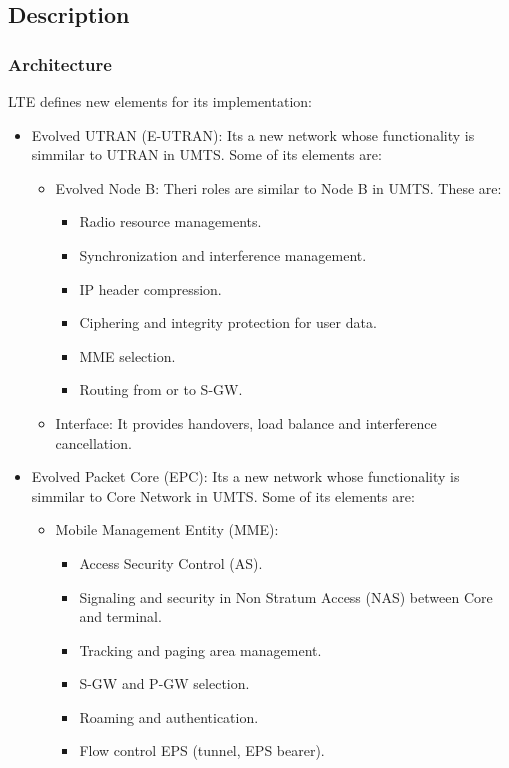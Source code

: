 \documentclass[
	12pt,
	twoside
]{book}
\begin{document}
\subsection{Description}

\subsubsection{Architecture}

LTE defines new elements for its implementation:
\begin{itemize}
	\item {
		Evolved UTRAN (E-UTRAN): Its a new network whose functionality is simmilar to UTRAN in UMTS. Some of its elements are:
		\begin{itemize}
			\item {
				Evolved Node B: Theri roles are similar to Node B in UMTS. These are:
				\begin{itemize}
					\item Radio resource managements.
					\item Synchronization and interference management.
					\item IP header compression.
					\item Ciphering and integrity protection for user data.
					\item MME selection.
					\item Routing from or to S-GW.
				\end{itemize}
			}
			\item Interface: It provides handovers, load balance and interference cancellation.
		\end{itemize}
	}
	\item {
		Evolved Packet Core (EPC): Its a new network whose functionality is simmilar to Core Network in UMTS. Some of its elements are:
		\begin{itemize}
			\item {
				Mobile Management Entity (MME):
				\begin{itemize}
					\item Access Security Control (AS).
					\item Signaling and security in Non Stratum Access (NAS) between Core and terminal.
					\item Tracking and paging area management.
					\item S-GW and P-GW selection.
					\item Roaming and authentication.
					\item Flow control EPS (tunnel, EPS bearer).

\end{itemize}}
\end{itemize}}
\end{itemize}
\end{document}
